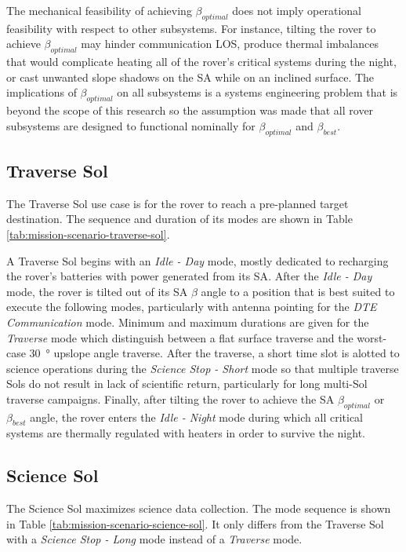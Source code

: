 The mechanical feasibility of achieving $\beta_{optimal}$ does not imply operational feasibility with respect to other subsystems. For instance, tilting the rover to achieve $\beta_{optimal}$ may hinder communication \ac{LOS}, produce thermal imbalances that would complicate heating all of the rover's critical systems during the night, or cast unwanted slope shadows on the \ac{SA} while on an inclined surface. The implications of $\beta_{optimal}$ on all subsystems is a systems engineering problem that is beyond the scope of this research so the assumption was made that all rover subsystems are designed to functional nominally for $\beta_{optimal}$ and $\beta_{best}$.

\subsection{Traverse Sol}
\label{sec:ReferenceSols:TraverseSol}
The Traverse Sol use case is for the rover to reach a pre-planned target destination. The sequence and duration of its modes are shown in Table \ref{tab:mission-scenario-traverse-sol}.


A Traverse Sol begins with an \textit{Idle - Day} mode, mostly dedicated to recharging the rover's batteries with power generated from its \ac{SA}. After the \textit{Idle - Day} mode, the rover is tilted out of its \ac{SA} $\beta$ angle to a position that is best suited to execute the following modes, particularly with antenna pointing for the \textit{\ac{DTE} Communication} mode. Minimum and maximum durations are given for the \textit{Traverse} mode which distinguish between a flat surface traverse and the worst-case \SI{30}{\degree} upslope angle traverse. After the traverse, a short time slot is alotted to science operations during the \textit{Science Stop - Short} mode so that multiple traverse Sols do not result in lack of scientific return, particularly for long multi-Sol traverse campaigns. Finally, after tilting the rover to achieve the \ac{SA} $\beta_{optimal}$ or $\beta_{best}$ angle, the rover enters the \textit{Idle - Night} mode during which all critical systems are thermally regulated with heaters in order to survive the night.

\subsection{Science Sol}
\label{sec:ReferenceSols:ScienceSol}
The Science Sol maximizes science data collection. The mode sequence is shown in Table \ref{tab:mission-scenario-science-sol}. It only differs from the Traverse Sol with a \textit{Science Stop - Long} mode instead of a \textit{Traverse} mode.


